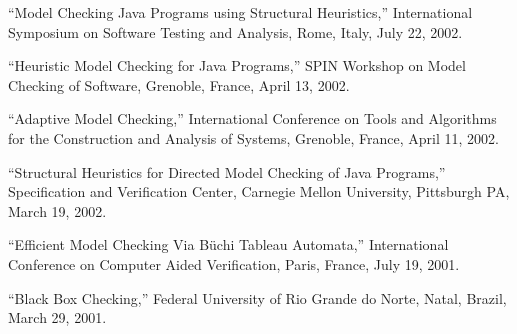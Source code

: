 \documentclass[ComputerScience]{vita}
\begin{document}
\begin{vita}
\begin{Selected Presentations}


  \item ``Model Checking Java Programs using Structural Heuristics,''  International Symposium on Software Testing and Analysis, Rome, Italy, July 22, 2002.

  \item ``Heuristic Model Checking for Java Programs,''  SPIN Workshop on Model Checking of Software, Grenoble, France, April 13, 2002.

  \item ``Adaptive Model Checking,''  International Conference on Tools and Algorithms for the Construction and Analysis of Systems, Grenoble, France, April 11, 2002.

  \item ``Structural Heuristics for Directed Model Checking of Java Programs,''  Specification and Verification Center, Carnegie Mellon University, Pittsburgh PA,  March 19, 2002.

  \item ``Efficient Model Checking Via B\"uchi Tableau Automata,''  International Conference on Computer Aided Verification, Paris, France, July 19, 2001.     

  \item ``Black Box Checking,''  Federal University of Rio Grande do Norte, Natal, Brazil, March 29, 2001.

\end{Selected Presentations}

\end{vita}
\end{document}
